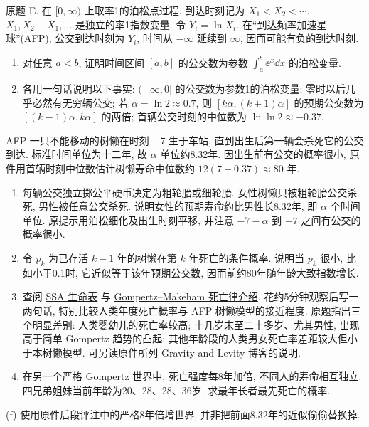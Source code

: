 \begin{exercise}\label{ps5-e}
原题 E. 在 $[0,\infty)$ 上取率1的泊松点过程, 到达时刻记为 $X_1<X_2<\cdots$. $X_1,X_2-X_1,\ldots$ 是独立的率1指数变量. 令 $Y_i=\ln X_i$. 在“到达频率加速星球”(AFP), 公交到达时刻为 $Y_i$, 时间从 $-\infty$ 延续到 $\infty$, 因而可能有负的到达时刻.
\begin{enumerate}[label=(\alph*)]
\item 对任意 $a<b$, 证明时间区间 $[a,b]$ 的公交数为参数 $\int_a^b\ee^x\dd x$ 的泊松变量.
\item 各用一句话说明以下事实: $(-\infty,0]$ 的公交数为参数1的泊松变量; 零时以后几乎必然有无穷辆公交; 若 $\alpha=\ln2\approx0.7$, 则 $[k\alpha,(k+1)\alpha]$ 的预期公交数为 $[(k-1)\alpha,k\alpha]$ 的两倍; 首辆公交时刻的中位数为 $\ln\ln2\approx-0.37$.
\end{enumerate}
AFP 一只不能移动的树懒在时刻 $-7$ 生于车站, 直到出生后第一辆会杀死它的公交到达. 标准时间单位为十二年, 故 $\alpha$ 单位约8.32年. 因出生前有公交的概率很小, 原件用首辆时刻中位数估计树懒寿命中位数约 $12(7-0.37)\approx80$ 年.
\begin{enumerate}[label=(\alph*),start=3]
\item 每辆公交独立掷公平硬币决定为粗轮胎或细轮胎. 女性树懒只被粗轮胎公交杀死, 男性被任意公交杀死. 说明女性的预期寿命约比男性长8.32年, 即 $\alpha$ 个时间单位. 原提示用泊松细化及出生时刻平移, 并注意 $-7-\alpha$ 到 $-7$ 之间有公交的概率很小.
\item 令 $p_k$ 为已存活 $k-1$ 年的树懒在第 $k$ 年死亡的条件概率. 说明当 $p_k$ 很小, 比如小于0.1时, 它近似等于该年预期公交数, 因而前约80年随年龄大致指数增长.
\item 查阅 \href{https://www.ssa.gov/oact/STATS/table4c6.html}{SSA 生命表} 与 \href{https://en.wikipedia.org/wiki/Gompertz%E2%80%93Makeham_law_of_mortality}{Gompertz--Makeham 死亡律介绍}, 花约5分钟观察后写一两句话, 特别比较人类年度死亡概率与 AFP 树懒模型的接近程度. 原题指出三个明显差别: 人类婴幼儿的死亡率较高; 十几岁末至二十多岁、尤其男性, 出现高于简单 Gompertz 趋势的凸起; 其他年龄段的人类男女死亡率差距较大但小于本树懒模型. 可另读原件所列 Gravity and Levity 博客的说明.
\item 在另一个严格 Gompertz 世界中, 死亡强度每8年加倍, 不同人的寿命相互独立. 四兄弟姐妹当前年龄为20、28、28、36岁. 求最年长者最先死亡的概率.
\end{enumerate}
(f) 使用原件后段评注中的严格8年倍增世界, 并非把前面8.32年的近似偷偷替换掉.
\end{exercise}
